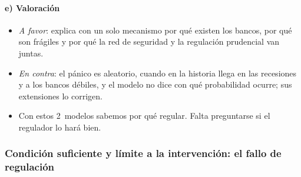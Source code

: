\documentclass[11pt]{article}
\begin{document}
\paragraph{e) Valoración}

\begin{itemize}
\item \emph{A favor}: explica con un solo mecanismo por qué existen los bancos, por qué son frágiles y por qué la red de seguridad y la regulación prudencial van juntas.
\item \emph{En contra}: el pánico es aleatorio, cuando en la historia llega en las recesiones y a los bancos débiles, y el modelo no dice con qué probabilidad ocurre; sus extensiones lo corrigen.
\item Con estos 2~modelos sabemos por qué regular. Falta preguntarse si el regulador lo hará bien.
\end{itemize}

\subsubsection{Condición suficiente y límite a la intervención: el fallo de regulación}\label{sec:fallo-regulacion}
\end{document}
